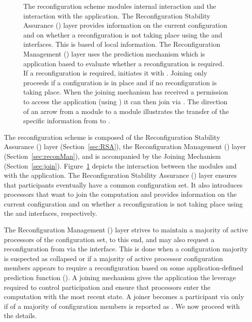 \documentclass[11pt]{article}
\begin{document}
\begin{figure}[t!]
\caption{
The reconfiguration scheme modules internal interaction and the interaction with the application. 
The Reconfiguration Stability Assurance () layer provides information on the current configuration and on whether a reconfiguration is not taking place using the  and  interfaces.
This is based of local information.
The Reconfiguration Management () layer uses the prediction mechanism  which is application based to evaluate whether a reconfiguration is required.
If a reconfiguration is required,  initiates it with .
Joining only proceeds if a configuration is in place and if no reconfiguration is taking place.
When the joining mechanism has received a permission to access the application (using  ) it can then join via .
The direction of an arrow from a module  to a module  illustrates the transfer of the specific information from  to .
}

\label{fig:modules}
\end{figure}

The reconfiguration scheme is composed of the Reconfiguration Stability Assurance () layer (Section~\ref{sec:RSA}), the Reconfiguration Management () layer (Section~\ref{sec:reconMan}), and is accompanied by the Joining Mechanism (Section~\ref{sec:join}).
Figure~\ref{fig:modules} depicts the interaction between the modules and with the application. 
The Reconfiguration Stability Assurance () layer ensures that participants eventually have a common configuration set.
It also introduces processors that want to join the computation and provides information on the current configuration and on whether a reconfiguration is not taking place using the  and  interfaces, respectively.

The Reconfiguration Management () layer strives to maintain a majority of active processors of the configuration set, to this end, and may also request a reconfiguration from  via the  interface. 
This is done when a configuration majority is suspected as collapsed or if a majority of active processor configuration members appears to require a reconfiguration based on some application-defined prediction function ().
A joining mechanism gives the application the leverage required to control participation and ensure that processors enter the computation with the most recent state.
A joiner becomes a participant via  only if  of a majority of configuration members is reported as . 
We now proceed with the details. 
\end{document}

